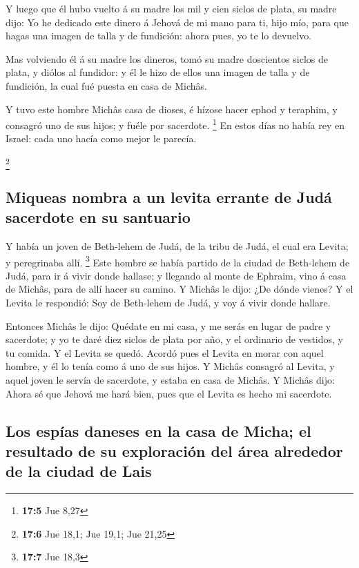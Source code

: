  Y luego que él hubo vuelto á su madre los mil y cien
siclos de plata, su madre dijo: Yo he dedicado este dinero á Jehová de
mi mano para ti, hijo mío, para que hagas una imagen de talla y de
fundición: ahora pues, yo te lo devuelvo.

 Mas volviendo él á su madre los dineros, tomó su madre
doscientos siclos de plata, y diólos al fundidor: y él le hizo de ellos
una imagen de talla y de fundición, la cual fué puesta en casa de
Michâs.

 Y tuvo este hombre Michâs casa de dioses, é hízose hacer
ephod y teraphim, y consagró uno de sus hijos; y fuéle por sacerdote.
\footnote{\textbf{17:5} Jue 8,27}  En estos días no había
rey en Israel: cada uno hacía como mejor le parecía.

\footnote{\textbf{17:6} Jue 18,1; Jue 19,1; Jue 21,25}

\hypertarget{miqueas-nombra-a-un-levita-errante-de-juduxe1-sacerdote-en-su-santuario}{%
\subsection{Miqueas nombra a un levita errante de Judá sacerdote en su
santuario}\label{miqueas-nombra-a-un-levita-errante-de-juduxe1-sacerdote-en-su-santuario}}

 Y había un joven de Beth-lehem de Judá, de la tribu de
Judá, el cual era Levita; y peregrinaba allí. \footnote{\textbf{17:7}
  Jue 18,3}  Este hombre se había partido de la ciudad de
Beth-lehem de Judá, para ir á vivir donde hallase; y llegando al monte
de Ephraim, vino á casa de Michâs, para de allí hacer su camino.
 Y Michâs le dijo: ¿De dónde vienes? Y el Levita le
respondió: Soy de Beth-lehem de Judá, y voy á vivir donde hallare.

 Entonces Michâs le dijo: Quédate en mi casa, y me serás
en lugar de padre y sacerdote; y yo te daré diez siclos de plata por
año, y el ordinario de vestidos, y tu comida. Y el Levita se quedó.
 Acordó pues el Levita en morar con aquel hombre, y él lo
tenía como á uno de sus hijos.  Y Michâs consagró al
Levita, y aquel joven le servía de sacerdote, y estaba en casa de
Michâs.  Y Michâs dijo: Ahora sé que Jehová me hará bien,
pues que el Levita es hecho mi sacerdote.

\hypertarget{los-espuxedas-daneses-en-la-casa-de-micha-el-resultado-de-su-exploraciuxf3n-del-uxe1rea-alrededor-de-la-ciudad-de-lais}{%
\subsection{Los espías daneses en la casa de Micha; el resultado de su
exploración del área alrededor de la ciudad de
Lais}\label{los-espuxedas-daneses-en-la-casa-de-micha-el-resultado-de-su-exploraciuxf3n-del-uxe1rea-alrededor-de-la-ciudad-de-lais}}

